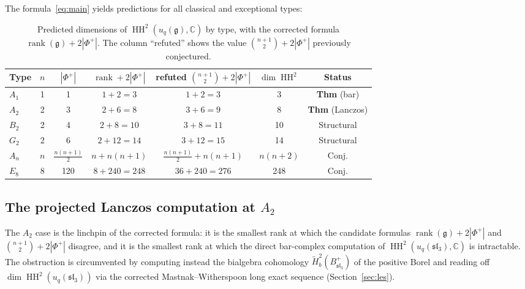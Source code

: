 \documentclass[11pt,letterpaper]{amsart}
\theoremstyle{plain}
\theoremstyle{definition}
\theoremstyle{remark}
\newcommand{\HH}{\operatorname{HH}}
\newcommand{\CC}{\mathbb{C}}
\begin{document}
The formula~\eqref{eq:main} yields predictions for all classical and exceptional types:

\begin{table}[htbp]
\centering
\caption{Predicted dimensions of $\HH^2(u_q(\mathfrak{g}), \CC)$ by type, with the corrected formula $\operatorname{rank}(\mathfrak{g}) + 2|\Phi^+|$. The column ``refuted'' shows the value $\binom{n+1}{2} + 2|\Phi^+|$ previously conjectured.}
\label{tab:predictions}
\begin{tabular}{@{}lcccccc@{}}
\toprule
Type & $n$ & $|\Phi^+|$ & $\operatorname{rank}+2|\Phi^+|$ & refuted $\binom{n+1}{2}+2|\Phi^+|$ & $\dim \HH^2$ & Status \\
\midrule
$A_1$ & 1 & 1  & $1+2=3$    & $1+2=3$    & 3   & \textbf{Thm} (bar) \\
$A_2$ & 2 & 3  & $2+6=8$    & $3+6=9$    & 8   & \textbf{Thm} (Lanczos) \\
$B_2$ & 2 & 4  & $2+8=10$   & $3+8=11$   & 10  & Structural \\
$G_2$ & 2 & 6  & $2+12=14$  & $3+12=15$  & 14  & Structural \\
$A_n$ & $n$ & $\frac{n(n+1)}{2}$ & $n+n(n+1)$ & $\frac{n(n+1)}{2}+n(n+1)$ & $n(n+2)$ & Conj. \\
$E_8$ & 8 & 120 & $8+240=248$ & $36+240=276$ & 248 & Conj. \\
\bottomrule
\end{tabular}
\end{table}

\subsection{The projected Lanczos computation at $A_2$}
\label{sec:lanczos}

The $A_2$ case is the linchpin of the corrected formula: it is the smallest rank at which the candidate formulas $\operatorname{rank}(\mathfrak{g}) + 2|\Phi^+|$ and $\binom{n+1}{2} + 2|\Phi^+|$ disagree, and it is the smallest rank at which the direct bar-complex computation of $\HH^2(u_q(\mathfrak{sl}_3), \CC)$ is intractable. The obstruction is circumvented by computing instead the bialgebra cohomology $\tilde{H}^2_b(B^+_{\mathfrak{sl}_3})$ of the positive Borel and reading off $\dim \HH^2(u_q(\mathfrak{sl}_3))$ via the corrected Mastnak--Witherspoon long exact sequence (Section~\ref{sec:les}).
\end{document}
